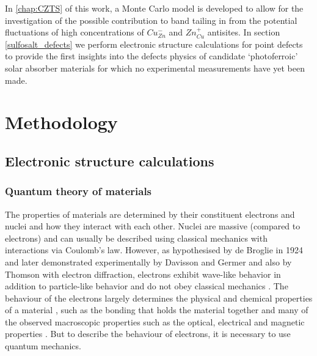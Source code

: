 \documentclass[11pt, twoside]{report}
\begin{document}
In \autoref{chap:CZTS} of this work, a Monte Carlo model is developed to allow for the investigation of the possible contribution to band tailing in {\CZTS} from the potential fluctuations of high concentrations of $Cu_{Zn}^{-}$ and $Zn_{Cu}^{+}$ antisites. In section \ref{sulfosalt_defects} we perform electronic structure calculations for point defects to provide the first insights into the defects physics of candidate `photoferroic' solar absorber materials for which no experimental measurements have yet been made.


\chapter{Methodology}

\section{Electronic structure calculations}\label{elec_struc}

\subsection{Quantum theory of materials}


The properties of materials are determined by their constituent electrons and nuclei and how they interact with each other. Nuclei are massive (compared to electrons) and can usually be described using classical mechanics with interactions via Coulomb's law. However, as hypothesised by de Broglie in 1924 and later demonstrated experimentally by Davisson and Germer and also by Thomson with electron diffraction, electrons exhibit wave-like behavior in addition to particle-like behavior and do not obey classical mechanics \cite{quantum_intro}. The behaviour of the electrons largely determines the physical and chemical properties of a material \cite{Prasad_ch2}, such as the bonding that holds the material together and many of the observed macroscopic properties such as the optical, electrical and magnetic properties \cite{RichardMartin_Ch1}. But to describe the behaviour of electrons, it is necessary to use quantum mechanics.
\end{document}
